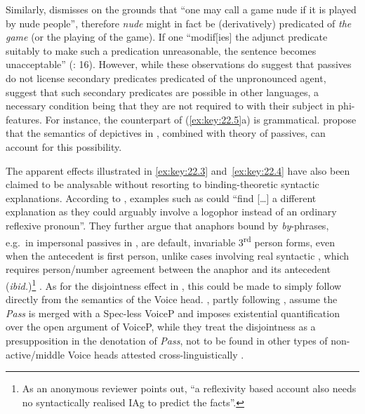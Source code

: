\documentclass[output=paper]{langsci/langscibook}
\begin{document}
\ea\label{ex:key:22.5}
    \z
\z

Similarly, \citet{Williams1985} dismisses  on the grounds that
“one may call a game nude if it is played by nude people”, therefore
\emph{nude} might in fact be (derivatively) predicated of \emph{the}
\emph{game} (or the playing of the game).  If one “modif[ies] the adjunct
predicate suitably to make such a predication unreasonable, the sentence
becomes unacceptable” (\citealt{BhattPancheva2006}: 16).  However, while these
observations do suggest that  passives do not license secondary
predicates predicated of the unpronounced agent, \citet{AlexiadouEtAl2015}
suggest that such secondary predicates are possible in other languages, a
necessary condition being that they are not required to  with their
subject in phi-features. For instance, the  counterpart of
(\ref{ex:key:22.5}a) is grammatical. \citet{PitteroffSchafer2017} propose that
the semantics of depictives in \citet{Pylkkanen2008}, combined with
 theory of passives, can account for this possibility.

The apparent  effects illustrated in \eqref{ex:key:22.3}
and~\eqref{ex:key:22.4} have also been claimed to be analysable without
resorting to binding-theoretic syntactic explanations.  According to
\citet[219]{AlexiadouEtAl2015}, examples such as  could “find
[\dots{}] a different explanation as they could arguably involve a logophor
instead of an ordinary reflexive pronoun”. They further argue that anaphors
bound by \emph{by}-phrases, e.g.\ in impersonal passives in ,
are default, invariable 3\textsuperscript{rd} person forms, even when the
antecedent is first person, unlike cases involving real syntactic ,
which requires person/number agreement between the anaphor and its antecedent
(\emph{ibid.})\footnote{As an anonymous reviewer points out, “a reflexivity
based account also needs no syntactically realised \gls{IAg} to predict the facts”.} .  As for the disjointness effect in
, this could be made to simply follow directly from the
semantics of the  Voice head.  \citet{SpathasEtAl2015}, partly
following \citet{Bruening2014}, assume the \emph{Pass} is merged with a
Spec-less VoiceP and imposes existential quantification over the open argument
of VoiceP, while they treat the disjointness as a presupposition in the
denotation of \emph{Pass}, not to be found in other types of non-active/middle
Voice heads attested cross-linguistically .
\end{document}
